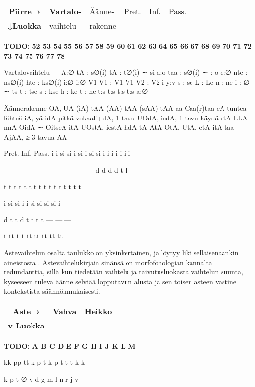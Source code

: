 \documentclass[free]{flammie}
\begin{document}
\begin{table}
    \label{Verbiluokkien äänne- ja muotorakenne sekä
    muut erottavat piirteet}
    \begin{tabular}{|c||l|l|l|l|l|}
        \hline
        \bf Piirre→ &
        \bf Vartalo- & Äänne- & Pret. & Inf. & Pass. \\
        \bf ↓Luokka &
        vaihtelu & rakenne & & & \\
        \hline
    \end{tabular}
    \bf TODO:
52
53
54
55
56
57
58
59
60
61
62
63
64
65
66
67
68
69
70
71
72
73
74
75
76
77
78

Vartalovaihtelu
—
A:∅
tA : s∅(i)
tA : t∅(i) ∼ si
a:o
taa : s∅(i) ∼ : o
e:∅
nte : ns∅(i)
hte : ks∅(i)
i:∅
i:∅
V1 V1 : V1
V1 V2 : V2 i
y:v
s : se
L : Le
n : ne
i : ∅ ∼ ts
t : tse
s : kse
h : ke
t : ne
t:s
t:s
t:s
t:s
a:∅
—

Äännerakenne
OA, UA (iA)
tAA (AA)
tAA (sAA)
tAA
aa
Caa(r)taa
eA
tuntea
lähteä
iA, yä
idA
pitkä vokaali+dA, 1 tavu
UOdA, iedA, 1 tavu
käydä
stA
LLA
nnA
OidA ∼ OitseA
itA
UOstA, iestA
hdA
tA
AtA
OtA, UtA, etA
itA
taa
AjAA, ≥ 3 tavua
AA

Pret. Inf. Pass.
i
i
si
si
i
si
i
si
si
i
i
i
i
i
i
i

—
—
—
—
—
—
—
—
—
—
d
d
d
d
t
l

t
t
t
t
t
t
t
t
t
t
t
t
t
t
t
t

i
si
si
i
i
si
si
si
si
i
—

d
t
t
d
t
t
t
t
—
—
—

t
tt
t
t
tt
tt
tt
tt
tt
—
—
\end{table}

Astevaihtelun osalta taulukko on yksinkertainen, ja löytyy liki sellaisenaankin
aineistosta \cite{nykysuomensanalista2006}. Astevaihtelukirjain
sinänsä on morfofonologian kannalta redundanttia, sillä kun tiedetään vaihtelu
ja taivutusluokasta vaihtelun suunta, kyseeseen tuleva äänne selviää lopputavun
alusta ja sen toisen asteen vastine kontekstista säännönmukaisesti.

\begin{table}
    \label{Astevaihteluluokkien vaihteluparit}
    \begin{tabular}{|c||l|l|}
        \hline
        \bf Aste→ & \bf Vahva & \bf Heikko \\
        \bf v Luokka & & \\
        \hline
    \end{tabular}
    \bf TODO:
A
B
C
D
E
F
G
H
I
J
K
L
M

kk
pp
tt
k
p
t
k
p
t
t
t
k
k

k
p
t
∅
v
d
g
m
l
n
r
j
v
\end{table}
\end{document}
